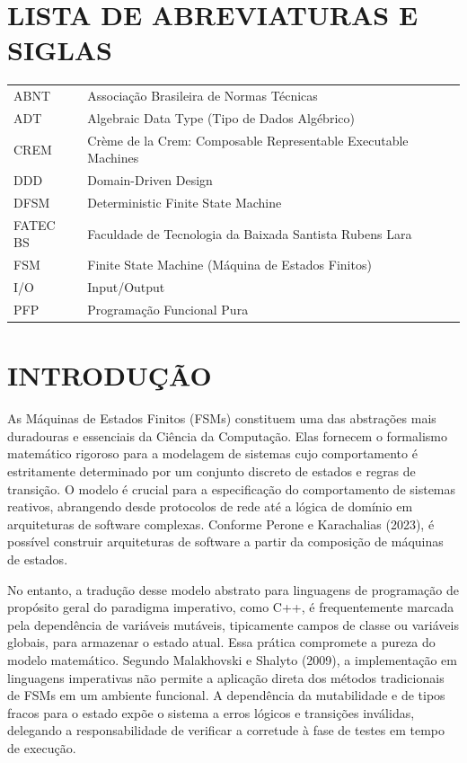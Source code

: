 \documentclass[12pt,a4paper]{article}
\begin{document}
\newpage
\section*{LISTA DE ABREVIATURAS E SIGLAS}

\begin{tabular}{ll}
ABNT & Associação Brasileira de Normas Técnicas\\
ADT & Algebraic Data Type (Tipo de Dados Algébrico)\\
CREM & Crème de la Crem: Composable Representable Executable Machines\\
DDD & Domain-Driven Design\\
DFSM & Deterministic Finite State Machine\\
FATEC BS & Faculdade de Tecnologia da Baixada Santista Rubens Lara\\
FSM & Finite State Machine (Máquina de Estados Finitos)\\
I/O & Input/Output\\
PFP & Programação Funcional Pura\\
\end{tabular}

\newpage
\tableofcontents

\newpage
\section{INTRODUÇÃO}

As Máquinas de Estados Finitos (FSMs) constituem uma das abstrações mais duradouras e essenciais da Ciência da Computação. Elas fornecem o formalismo matemático rigoroso para a modelagem de sistemas cujo comportamento é estritamente determinado por um conjunto discreto de estados e regras de transição. O modelo é crucial para a especificação do comportamento de sistemas reativos, abrangendo desde protocolos de rede até a lógica de domínio em arquiteturas de software complexas. Conforme Perone e Karachalias (2023), é possível construir arquiteturas de software a partir da composição de máquinas de estados.

No entanto, a tradução desse modelo abstrato para linguagens de programação de propósito geral do paradigma imperativo, como C++, é frequentemente marcada pela dependência de variáveis mutáveis, tipicamente campos de classe ou variáveis globais, para armazenar o estado atual. Essa prática compromete a pureza do modelo matemático. Segundo Malakhovski e Shalyto (2009), a implementação em linguagens imperativas não permite a aplicação direta dos métodos tradicionais de FSMs em um ambiente funcional. A dependência da mutabilidade e de tipos fracos para o estado expõe o sistema a erros lógicos e transições inválidas, delegando a responsabilidade de verificar a corretude à fase de testes em tempo de execução.
\end{document}
